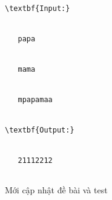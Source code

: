 \begin{verbatim}
\textbf{Input:}


   papa


   mama


   mpapamaa


\textbf{Output:}


   21112212


\end{verbatim}
	\item    Mới cập nhật đề bài và test
